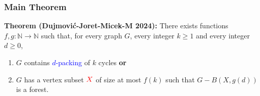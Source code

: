 \documentclass{beamer}
\newcommand{\N}{\mathbb{N}}
\begin{document}
\begin{frame}
  \frametitle{Main Theorem}

  \noindent\textbf{Theorem (Dujmović-Joret-Micek-M 2024):} There exists functions $f,g:\N\to\N$ such that, for every graph $G$, every integer $k\ge 1$ and every integer $d\ge 0$,
  \begin{enumerate}%
    \item $G$ contains \textcolor{blue}{$d$-packing} of $k$ cycles \textbf{or}
    \item $G$ has a vertex subset $\mathcolor{red}{X}$ of size at most $f(k)$ such that $G-B(X,g(d))$ is a forest.  \newline {}
  \end{enumerate}


\end{frame}
\end{document}
